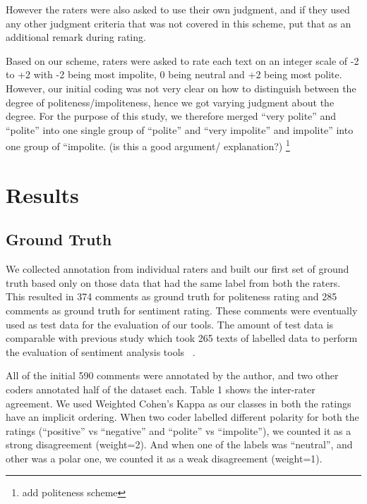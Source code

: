 However the raters were also asked to use their own judgment, and if they used any other judgment criteria that was not covered in this scheme, put that as an additional remark during rating.

Based on our scheme, raters were asked to rate each text on an integer scale of -2 to +2 with -2 being most impolite, 0 being neutral and +2 being most polite. However, our initial coding was not very clear on how to distinguish between the degree of politeness/impoliteness, hence we got varying judgment about the degree. For the purpose of this study, we therefore merged “very polite” and “polite” into one single group of “polite” and “very impolite” and impolite” into one group of “impolite. (is this a good argument/ explanation?) \footnote{add politeness scheme}


\section{Results}

\subsection{Ground Truth}\label{gt}
We collected annotation from individual raters and built our first set of ground truth based only on those data that had the same label from both the raters. This resulted in 374 comments as ground truth for politeness rating and 285 comments as ground truth for sentiment rating. These comments were eventually used as test data for the evaluation of our tools. The amount of test data is comparable with previous study which took 265 texts of labelled data to perform the evaluation of sentiment analysis tools ~\cite{jongeling2017negative}.

All of the initial 590 comments were annotated by the author, and two other coders annotated half of the dataset each. Table 1 shows the inter-rater agreement. We used Weighted Cohen's Kappa as our classes in both the ratings have an implicit ordering. When two coder labelled different polarity for both the ratings (“positive” vs “negative” and “polite” vs “impolite”), we counted it as a strong disagreement (weight=2). And when one of the labels was “neutral”, and other was a polar one, we counted it as a weak disagreement (weight=1).

